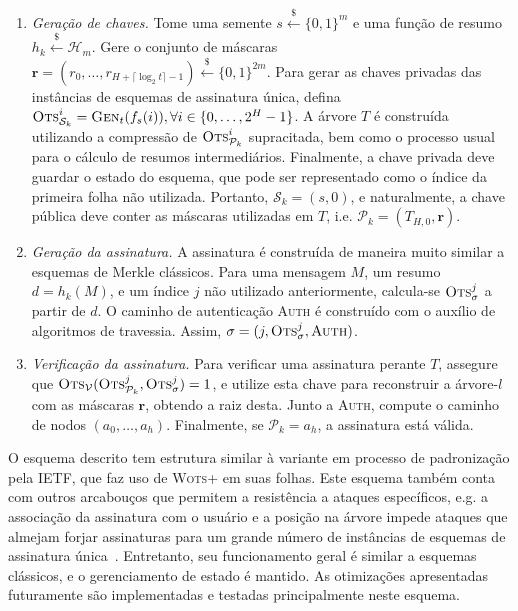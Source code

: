 \documentclass[12pt,notitlepage]{report}
\newcommand{\hh}{\mathcal{H}}
\newcommand{\pk}{\mathcal{P}_k}
\newcommand{\sk}{\mathcal{S}_k}
\newcommand{\binwds}[1]{\{0, 1\}^{#1}}
\begin{document}
\begin{enumerate}

  \item[] \emph{Geração de chaves.} Tome uma semente $s \stackrel{\$}{\longleftarrow} \binwds{m}$ e uma função de resumo $h_k \stackrel{\$}{\longleftarrow} \hh{}_m$. Gere o conjunto de máscaras $\mathbf{r} = (r_0, \dots, r_{H + \lceil \log_{2} t \rceil - 1}) \stackrel{\$}{\longleftarrow} \binwds{2m}$. Para gerar as chaves privadas das instâncias de esquemas de assinatura única, defina $\textsc{Ots}_{\sk{}}^{i} = \textsc{Gen}_t(f_s(i)), \forall i \in \{0, \dots, 2^H - 1\}$. A árvore $T$ é construída utilizando a compressão de $\textsc{Ots}_{\pk{}}^{i}$ supracitada, bem como o processo usual para o cálculo de resumos intermediários. Finalmente, a chave privada deve guardar o estado do esquema, que pode ser representado como o índice da primeira folha não utilizada. Portanto, $\sk{} = (s, 0)$, e naturalmente, a chave pública deve conter as máscaras utilizadas em $T$, i.e. $\pk{} = (T_{H,0}, \mathbf{r})$.
  
  \item[] \emph{Geração da assinatura.} A assinatura é construída de maneira muito similar a esquemas de Merkle clássicos. Para uma mensagem $M$, um resumo $d = h_k(M)$, e um índice $j$
  não utilizado anteriormente, calcula-se $\textsc{Ots}_\sigma^{j}$ a partir de $d$. O caminho de autenticação \textsc{Auth} é construído com o auxílio de algoritmos de travessia. Assim, $\sigma = (j, \textsc{Ots}_\sigma^{j}, \textsc{Auth})$.
  
  \item[] \emph{Verificação da assinatura.} Para verificar uma assinatura perante $T$, assegure que $\textsc{Ots}_{\mathcal{V}}(\textsc{Ots}_{\pk{}}^{j}, \textsc{Ots}_{\sigma}^{j}) = 1$, e utilize esta chave para reconstruir a árvore-$l$ com as máscaras $\mathbf{r}$, obtendo a raiz desta. Junto a \textsc{Auth}, compute o caminho de nodos $(a_0, \dots, a_h)$. Finalmente, se $\pk{} = a_{h}$, a assinatura está válida.

\end{enumerate}

O esquema descrito tem estrutura similar à variante em processo de padronização pela IETF, que faz uso de \textsc{Wots+} em suas folhas. Este esquema também conta com outros arcabouços que permitem a resistência a ataques específicos, e.g. a associação da assinatura com o usuário e a posição na árvore impede ataques que almejam forjar assinaturas para um grande número de instâncias de esquemas de assinatura única~\cite[9.1]{irtf-cfrg-xmss-hash-based-signatures-12}. Entretanto, seu funcionamento geral é similar a esquemas clássicos, e o gerenciamento de estado é mantido. As otimizações apresentadas futuramente são implementadas e testadas principalmente neste esquema. 
\end{document}
